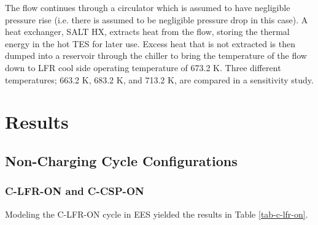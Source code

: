 \begin{paracol}{2}
\linenumbers
\switchcolumn

The flow continues through a circulator which is assumed to have negligible pressure rise (i.e. there is assumed to be negligible pressure drop in this case). A heat exchanger, SALT HX, extracts heat from the flow, storing the thermal energy in the hot TES for later use. Excess heat that is not extracted is then dumped into a reservoir through the chiller to bring the temperature of the flow down to LFR cool side operating temperature of 673.2 K. Three different temperatures; 663.2 K, 683.2 K, and 713.2 K, are compared in a sensitivity study. 



\section{Results}

\subsection{Non-Charging Cycle Configurations}

\subsubsection{C-LFR-ON and C-CSP-ON}

Modeling the C-LFR-ON cycle in EES yielded the results in Table \ref{tab-c-lfr-on}. 


\end{paracol}
